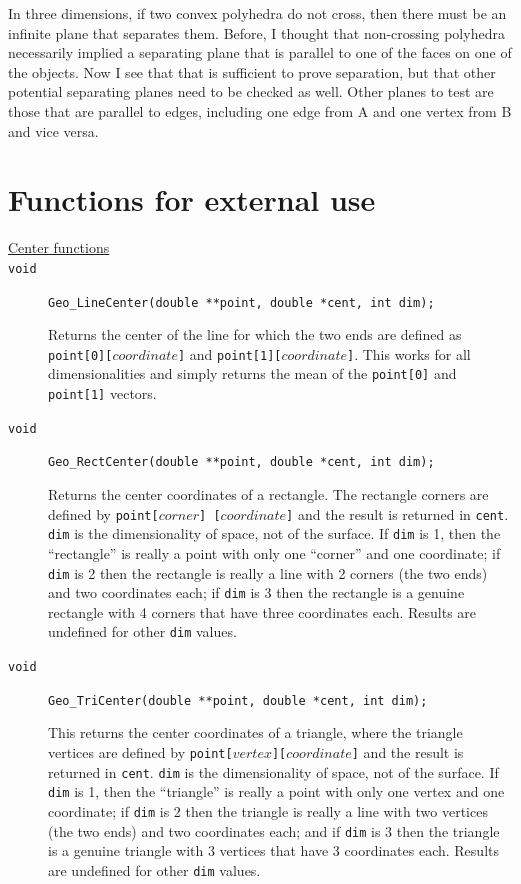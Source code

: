 \documentclass[11pt]{article}
\newcommand {\ttt} {\texttt}
\begin{document}
In three dimensions, if two convex polyhedra do not cross, then there must be an infinite plane that separates them. Before, I thought that non-crossing polyhedra necessarily implied a separating plane that is parallel to one of the faces on one of the objects. Now I see that that is sufficient to prove separation, but that other potential separating planes need to be checked as well. Other planes to test are those that are parallel to edges, including one edge from A and one vertex from B and vice versa.



\section{Functions for external use}

\begin{description}

\item[\underline{Center functions}]

\item[\ttt{void}]
\ttt{Geo\_LineCenter(double **point, double *cent, int dim);}

Returns the center of the line for which the two ends are defined as \ttt{point[0][$coordinate$]} and \ttt{point[1][$coordinate$]}. This works for all dimensionalities and simply returns the mean of the \ttt{point[0]} and \ttt{point[1]} vectors.

\item[\ttt{void}]
\ttt{Geo\_RectCenter(double **point, double *cent, int dim);}

Returns the center coordinates of a rectangle. The rectangle corners are defined by \ttt{point[$corner$] [$coordinate$]} and the result is returned in \ttt{cent}. \ttt{dim} is the dimensionality of space, not of the surface. If \ttt{dim} is 1, then the ``rectangle'' is really a point with only one ``corner'' and one coordinate; if \ttt{dim} is 2 then the rectangle is really a line with 2 corners (the two ends) and two coordinates each; if \ttt{dim} is 3 then the rectangle is a genuine rectangle with 4 corners that have three coordinates each. Results are undefined for other \ttt{dim} values.

\item[\ttt{void}]
\ttt{Geo\_TriCenter(double **point, double *cent, int dim);}

This returns the center coordinates of a triangle, where the triangle vertices are defined by \ttt{point[$vertex$][$coordinate$]} and the result is returned in \ttt{cent}. \ttt{dim} is the dimensionality of space, not of the surface. If \ttt{dim} is 1, then the ``triangle'' is really a point with only one vertex and one coordinate; if \ttt{dim} is 2 then the triangle is really a line with two vertices (the two ends) and two coordinates each; and if \ttt{dim} is 3 then the triangle is a genuine triangle with 3 vertices that have 3 coordinates each. Results are undefined for other \ttt{dim} values.


\end{description}
\end{document}
